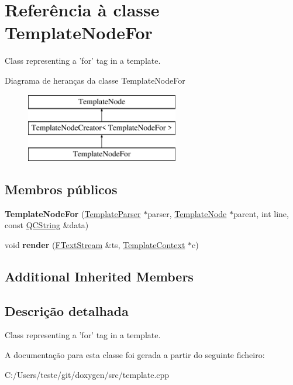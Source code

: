 \hypertarget{class_template_node_for}{\section{Referência à classe Template\-Node\-For}
\label{class_template_node_for}
}


Class representing a 'for' tag in a template.  


Diagrama de heranças da classe Template\-Node\-For\begin{figure}[H]
\begin{center}
\leavevmode
\includegraphics[height=3.000000cm]{class_template_node_for}
\end{center}
\end{figure}
\subsection*{Membros públicos}
\begin{DoxyCompactItemize}
\item 
\hypertarget{class_template_node_for_a0e5e65f8f14540ede684dbe97e84cf42}{{\bfseries Template\-Node\-For} (\hyperlink{class_template_parser}{Template\-Parser} $\ast$parser, \hyperlink{class_template_node}{Template\-Node} $\ast$parent, int line, const \hyperlink{class_q_c_string}{Q\-C\-String} \&data)}\label{class_template_node_for_a0e5e65f8f14540ede684dbe97e84cf42}

\item 
\hypertarget{class_template_node_for_aaa6575d8c79eeaa49f849f1ca1d6b228}{void {\bfseries render} (\hyperlink{class_f_text_stream}{F\-Text\-Stream} \&ts, \hyperlink{class_template_context}{Template\-Context} $\ast$c)}\label{class_template_node_for_aaa6575d8c79eeaa49f849f1ca1d6b228}

\end{DoxyCompactItemize}
\subsection*{Additional Inherited Members}


\subsection{Descrição detalhada}
Class representing a 'for' tag in a template. 

A documentação para esta classe foi gerada a partir do seguinte ficheiro\-:\begin{DoxyCompactItemize}
\item 
C\-:/\-Users/teste/git/doxygen/src/template.\-cpp\end{DoxyCompactItemize}
